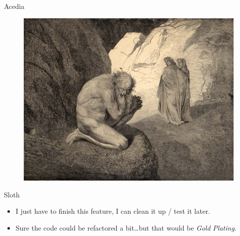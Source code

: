 \documentclass[12pt,xcolor=x11names]{beamer}
\begin{document}
\begin{frame}{Acedia}
    \begin{figure}
        \centering \includegraphics[height=0.75\textheight]{images/sloth.jpg}
    \end{figure}
\end{frame}
\begin{frame}{Sloth}
    \begin{itemize}
        \item I just have to finish this feature, I can clean it up / test it
            later.
        \item Sure the code could be refactored a bit\ldots but that would be
            \emph{Gold Plating}.
    \end{itemize}
\end{frame}
\end{document}
